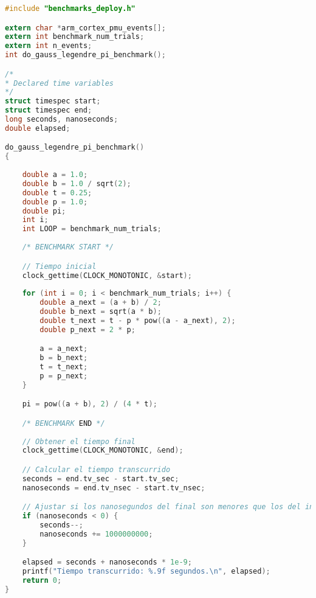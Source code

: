 \begin{lstlisting}[language=C,frame=single,showstringspaces=false,caption={Código fuente del benchmark Cálculo de decimales del número Pi},label=lst:calcpi-benchmark]
#include "benchmarks_deploy.h"

extern char *arm_cortex_pmu_events[];
extern int benchmark_num_trials;
extern int n_events;
int do_gauss_legendre_pi_benchmark();

/*
* Declared time variables
*/
struct timespec start;
struct timespec end;
long seconds, nanoseconds;
double elapsed;

do_gauss_legendre_pi_benchmark()
{
    
    double a = 1.0;
    double b = 1.0 / sqrt(2);
    double t = 0.25;
    double p = 1.0;
    double pi;
    int i;
    int LOOP = benchmark_num_trials;
    
    /* BENCHMARK START */

    // Tiempo inicial
    clock_gettime(CLOCK_MONOTONIC, &start);
    
    for (int i = 0; i < benchmark_num_trials; i++) {
        double a_next = (a + b) / 2;
        double b_next = sqrt(a * b);
        double t_next = t - p * pow((a - a_next), 2);
        double p_next = 2 * p;

        a = a_next;
        b = b_next;
        t = t_next;
        p = p_next;
    }

    pi = pow((a + b), 2) / (4 * t);

    /* BENCHMARK END */
    
    // Obtener el tiempo final
    clock_gettime(CLOCK_MONOTONIC, &end);

    // Calcular el tiempo transcurrido
    seconds = end.tv_sec - start.tv_sec;
    nanoseconds = end.tv_nsec - start.tv_nsec;

    // Ajustar si los nanosegundos del final son menores que los del inicio
    if (nanoseconds < 0) {
        seconds--;
        nanoseconds += 1000000000;
    }

    elapsed = seconds + nanoseconds * 1e-9;
    printf("Tiempo transcurrido: %.9f segundos.\n", elapsed);
    return 0;
}
\end{lstlisting}

